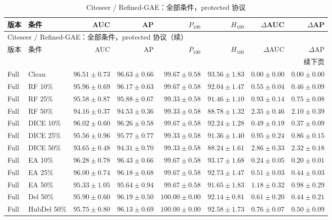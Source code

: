 {\footnotesize
\setlength{\tabcolsep}{3.2pt}
\renewcommand{\arraystretch}{1.10}
\begin{longtable}{llrrrrrr}
\caption{Citeseer / Refined-GAE：全部条件，protected 协议}\\
\toprule
版本 & 条件 & AUC & AP & $P_{100}$ & $H_{100}$ & $\Delta$AUC & $\Delta$AP \\
\midrule
\endfirsthead
\multicolumn{8}{l}{Citeseer / Refined-GAE：全部条件，protected 协议（续）}\\
\toprule
版本 & 条件 & AUC & AP & $P_{100}$ & $H_{100}$ & $\Delta$AUC & $\Delta$AP \\
\midrule
\endhead
\midrule\multicolumn{8}{r}{续下页}\\
\endfoot
\bottomrule
\endlastfoot
Full & Clean & $96.51\pm0.73$ & $96.63\pm0.66$ & $99.67\pm0.58$ & $93.56\pm1.83$ & $0.00\pm0.00$ & $0.00\pm0.00$ \\
Full & RF 10\% & $95.96\pm0.69$ & $96.17\pm0.63$ & $99.67\pm0.58$ & $92.04\pm1.47$ & $0.55\pm0.04$ & $0.46\pm0.09$ \\
Full & RF 25\% & $95.58\pm0.87$ & $95.88\pm0.67$ & $99.33\pm0.58$ & $91.46\pm1.10$ & $0.93\pm0.14$ & $0.75\pm0.08$ \\
Full & RF 50\% & $94.16\pm0.37$ & $94.53\pm0.36$ & $99.33\pm0.58$ & $88.78\pm1.32$ & $2.35\pm0.46$ & $2.10\pm0.39$ \\
Full & DICE 10\% & $96.02\pm0.60$ & $96.26\pm0.58$ & $99.67\pm0.58$ & $92.24\pm1.28$ & $0.49\pm0.19$ & $0.37\pm0.09$ \\
Full & DICE 25\% & $95.56\pm0.96$ & $95.77\pm0.77$ & $99.33\pm0.58$ & $91.36\pm1.40$ & $0.95\pm0.24$ & $0.86\pm0.15$ \\
Full & DICE 50\% & $93.65\pm0.48$ & $94.31\pm0.70$ & $99.33\pm0.58$ & $88.24\pm1.61$ & $2.86\pm0.33$ & $2.32\pm0.18$ \\
Full & EA 10\% & $96.28\pm0.78$ & $96.43\pm0.66$ & $99.67\pm0.58$ & $93.17\pm1.68$ & $0.24\pm0.05$ & $0.20\pm0.01$ \\
Full & EA 25\% & $96.00\pm0.74$ & $96.18\pm0.68$ & $99.67\pm0.58$ & $92.73\pm1.47$ & $0.51\pm0.03$ & $0.44\pm0.03$ \\
Full & EA 50\% & $95.33\pm1.05$ & $95.64\pm0.94$ & $99.67\pm0.58$ & $91.65\pm1.83$ & $1.18\pm0.32$ & $0.98\pm0.29$ \\
Full & Del 50\% & $95.90\pm0.60$ & $96.19\pm0.50$ & $100.00\pm0.00$ & $92.14\pm0.81$ & $0.61\pm0.20$ & $0.44\pm0.21$ \\
Full & HubDel 50\% & $95.75\pm0.80$ & $96.13\pm0.69$ & $100.00\pm0.00$ & $92.58\pm1.73$ & $0.76\pm0.07$ & $0.50\pm0.09$ \\

\end{longtable}}
